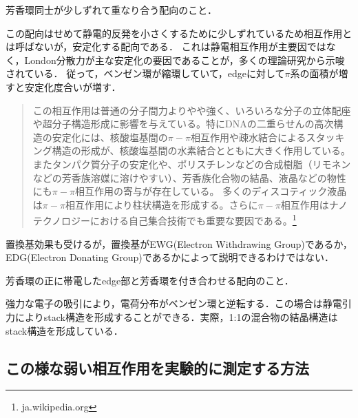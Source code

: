 \documentclass[uplatex, dvipdfmx]{jsreport}
\begin{document}
\begin{definition}
    芳香環同士が少しずれて重なり合う配向のこと．

    この配向はせめて静電的反発を小さくするために少しずれているため相互作用とは呼ばないが，安定化する配向である．
    これは静電相互作用が主要因ではなく，London分散力が主な安定化の要因であることが，多くの理論研究から示唆されている．
    従って，ベンゼン環が縮環していて，edgeに対して$\pi$系の面積が増すと安定化度合いが増す．
\end{definition}
\begin{example}
    \begin{quote}
        この相互作用は普通の分子間力よりやや強く、いろいろな分子の立体配座や超分子構造形成に影響を与えている。特にDNAの二重らせんの高次構造の安定化には、核酸塩基間の$\pi-\pi$相互作用や疎水結合によるスタッキング構造の形成が、核酸塩基間の水素結合とともに大きく作用している。またタンパク質分子の安定化や、ポリスチレンなどの合成樹脂（リモネンなどの芳香族溶媒に溶けやすい）、芳香族化合物の結晶、液晶などの物性にも$\pi-\pi$相互作用の寄与が存在している。
        多くのディスコティック液晶は$\pi-\pi$相互作用により柱状構造を形成する。さらに$\pi-\pi$相互作用はナノテクノロジーにおける自己集合技術でも重要な要因である。\footnote{ja.wikipedia.org}
    \end{quote}
\end{example}
\begin{remark}
    置換基効果も受けるが，置換基がEWG(Electron Withdrawing Group)であるか，EDG(Electron Donating Group)であるかによって説明できるわけではない．
\end{remark}
\begin{definition}
    芳香環の正に帯電したedge部と芳香環を付き合わせる配向のこと．
\end{definition}

\begin{example}[Perfluoro芳香環]
    強力な電子の吸引により，電荷分布がベンゼン環と逆転する．この場合は静電引力によりstack構造を形成することができる．実際，1:1の混合物の結晶構造はstack構造を形成している．
\end{example}

\subsection{この様な弱い相互作用を実験的に測定する方法}
\end{document}
